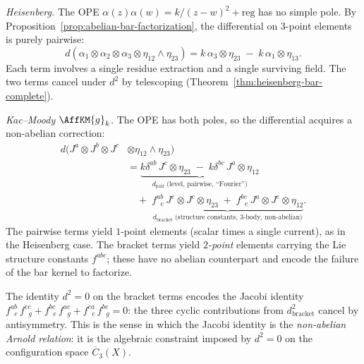\begin{example}
\label{ex:heisenberg-vs-km}

\emph{Heisenberg.}
The OPE $\alpha(z)\alpha(w) = k/(z{-}w)^2 + \mathrm{reg}$ has no
simple pole. By Proposition~\ref{prop:abelian-bar-factorization},
the differential on $3$-point elements is purely pairwise:
\[
d(\alpha_1 \otimes \alpha_2 \otimes \alpha_3
 \otimes \eta_{12} \wedge \eta_{23})
= k\, \alpha_3 \otimes \eta_{23}
 \;-\; k\, \alpha_1 \otimes \eta_{13}.
\]
Each term involves a single residue extraction and a single
surviving field. The two terms cancel under $d^2$ by telescoping
(Theorem~\ref{thm:heisenberg-bar-complete}).

\emph{Kac--Moody $\AffKM{g}_k$.}
The OPE has both poles, so the differential acquires a non-abelian
correction:
\begin{align*}
d(J^a \otimes J^b \otimes J^c
 &\otimes \eta_{12} \wedge \eta_{23}) \\
&= \underbrace{k\delta^{ab}\, J^c \otimes \eta_{23}
 \;-\; k\delta^{bc}\, J^a
 \otimes \eta_{12}}_{\displaystyle
 d_{\mathrm{pair}}\;\text{(level, pairwise, ``Fourier'')}} \\
&\quad+\; \underbrace{f^{ab}_{\;\;e}\, J^e \otimes J^c
 \otimes \eta_{23}
 \;+\; f^{bc}_{\;\;e}\, J^a \otimes J^e
 \otimes \eta_{12}}_{\displaystyle
 d_{\mathrm{bracket}}\;\text{(structure
 constants, $3$-body, non-abelian)}}.
\end{align*}
The pairwise terms yield $1$-point elements (scalar times a single
current), as in the Heisenberg case. The bracket terms yield
\emph{$2$-point} elements carrying the Lie structure constants
$f^{abc}$; these have no abelian counterpart and encode the failure
of the bar kernel to factorize.

The identity $d^2 = 0$ on the bracket terms encodes the Jacobi
identity
$f^{ab}_{\;\;e}\, f^{ec}_{\;\;g}
+ f^{bc}_{\;\;e}\, f^{ae}_{\;\;g}
+ f^{ca}_{\;\;e}\, f^{be}_{\;\;g} = 0$:
the three cyclic contributions from $d_{\mathrm{bracket}}^2$ cancel
by antisymmetry. This is the sense in which the Jacobi identity is
the \emph{non-abelian Arnold relation}: it is the algebraic
constraint imposed by $d^2 = 0$ on the configuration space
$\overline{C}_3(X)$.
\end{example}

